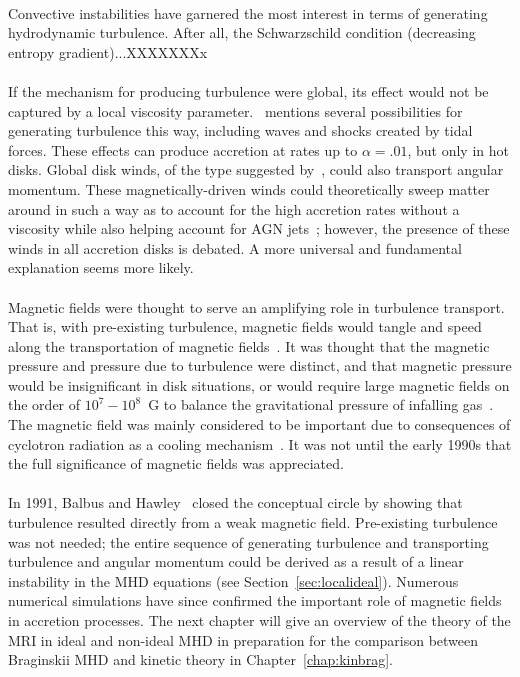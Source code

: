 \\
Convective instabilities have garnered the most interest in terms of generating hydrodynamic turbulence. After all, the Schwarzschild condition (decreasing entropy gradient)...XXXXXXXx\\
\\
If the mechanism for producing turbulence were global, its effect would not be captured by a local viscosity parameter.~\cite{Spruit2009} mentions several possibilities for generating turbulence this way, including waves and shocks created by tidal forces. These effects can produce accretion at rates up to $\alpha=.01$, but only in hot disks. Global disk winds, of the type suggested by~\citet{Blandford1977}, could also transport angular momentum. These magnetically-driven winds could theoretically sweep matter around in such a way as to account for the high accretion rates without a viscosity while also helping account for AGN jets~\cite{Koenigl1989}; however, the presence of these winds in all accretion disks is debated. A more universal and fundamental explanation seems more likely.\\
\\
Magnetic fields were thought to serve an amplifying role in turbulence transport. That is, with pre-existing turbulence, magnetic fields would tangle and speed along the transportation of magnetic fields~\cite{SS1973}. It was thought that the magnetic pressure and pressure due to turbulence were distinct, and that magnetic pressure would be insignificant in disk situations, or would require large magnetic fields on the order of $10^7-10^8$~G to balance the gravitational pressure of infalling gas~\cite{BH1998}. The magnetic field was mainly considered to be important due to consequences of cyclotron radiation as a cooling mechanism~\cite{Shapiro1973}. It was not until the early 1990s that the full significance of magnetic fields was appreciated.\\
\\
In 1991, Balbus and Hawley~\cite{BH1991a,BH1991b,BH1991c} closed the conceptual circle by showing that turbulence resulted directly from a weak magnetic field. Pre-existing turbulence was not needed; the entire sequence of generating turbulence and transporting turbulence and angular momentum could be derived as a result of a linear instability in the MHD equations (see Section~\ref{sec:localideal}). Numerous numerical simulations have since confirmed the important role of magnetic fields in accretion processes. The next chapter will give an overview of the theory of the MRI in ideal and non-ideal MHD in preparation for the comparison between Braginskii MHD and kinetic theory in Chapter~\ref{chap:kinbrag}.


